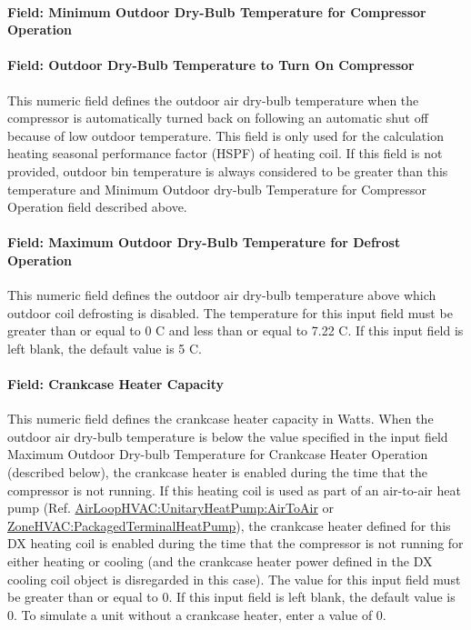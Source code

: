 \paragraph{Field: Minimum Outdoor Dry-Bulb Temperature for Compressor Operation}\label{field-minimum-outdoor-dry-bulb-temperature-for-compressor-operation}


\paragraph{Field: Outdoor Dry-Bulb Temperature to Turn On Compressor}\label{field-outdoor-dry-bulb-temperature-to-turn-on-compressor}

This numeric field defines the outdoor air dry-bulb temperature when the compressor is automatically turned back on following an automatic shut off because of low outdoor temperature. This field is only used for the calculation heating seasonal performance factor (HSPF) of heating coil. If this field is not provided, outdoor bin temperature is always considered to be greater than this temperature and Minimum Outdoor dry-bulb Temperature for Compressor Operation field described above.

\paragraph{Field: Maximum Outdoor Dry-Bulb Temperature for Defrost Operation}\label{field-maximum-outdoor-dry-bulb-temperature-for-defrost-operation}

This numeric field defines the outdoor air dry-bulb temperature above which outdoor coil defrosting is disabled. The temperature for this input field must be greater than or equal to 0 C and less than or equal to 7.22 C. If this input field is left blank, the default value is 5 C.

\paragraph{Field: Crankcase Heater Capacity}\label{field-crankcase-heater-capacity-4}

This numeric field defines the crankcase heater capacity in Watts. When the outdoor air dry-bulb temperature is below the value specified in the input field Maximum Outdoor Dry-bulb Temperature for Crankcase Heater Operation (described below), the crankcase heater is enabled during the time that the compressor is not running. If this heating coil is used as part of an air-to-air heat pump (Ref. \hyperref[airloophvacunitaryheatpumpairtoair]{AirLoopHVAC:UnitaryHeatPump:AirToAir} or \hyperref[zonehvacpackagedterminalheatpump]{ZoneHVAC:PackagedTerminalHeatPump}), the crankcase heater defined for this DX heating coil is enabled during the time that the compressor is not running for either heating or cooling (and the crankcase heater power defined in the DX cooling coil object is disregarded in this case). The value for this input field must be greater than or equal to 0. If this input field is left blank, the default value is 0. To simulate a unit without a crankcase heater, enter a value of 0.

